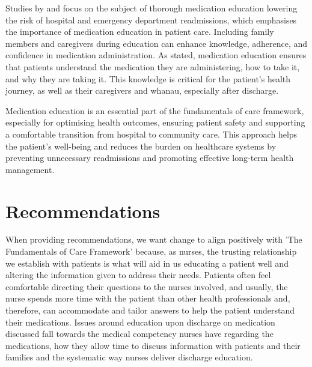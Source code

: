 \documentclass[british,12pt,a4paper]{article}
\begin{document}
Studies by \citeauthor{Alper2023} and \citeauthor{Phatak2015} focus on the subject of thorough medication education lowering the risk of hospital and emergency department readmissions, which emphasises the importance of medication education in patient care. Including family members and caregivers during education can enhance knowledge, adherence, and confidence in medication administration. As \citeauthor{Alper2023} stated, medication education ensures that patients understand the medication they are administering, how to take it, and why they are taking it. This knowledge is critical for the patient's health journey, as well as their caregivers and whanau, especially after discharge.

Medication education is an essential part of the fundamentals of care framework, especially for optimising health outcomes, ensuring patient safety and supporting a comfortable transition from hospital to community care. This approach helps the patient's well-being and reduces the burden on healthcare systems by preventing unnecessary readmissions and promoting effective long-term health management.

\section{Recommendations}
When providing recommendations, we want change to align positively with 'The Fundamentals of Care Framework' \parencite{Dempsey2013} because, as nurses, the trusting relationship we establish with patients is what will aid in us educating a patient well and altering the information given to address their needs. Patients often feel comfortable directing their questions to the nurses involved, and usually, the nurse spends more time with the patient than other health professionals and, therefore, can accommodate and tailor answers to help the patient understand their medications. Issues around education upon discharge on medication discussed fall towards the medical competency nurses have regarding the medications, how they allow time to discuss information with patients and their families and the systematic way nurses deliver discharge education.
\end{document}
